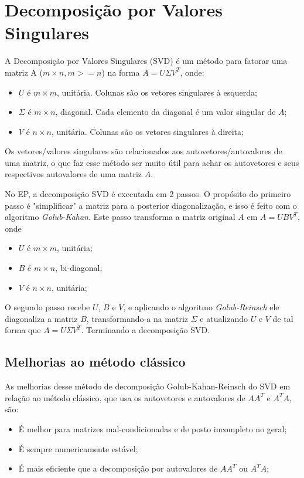 




\cabecalho

\section{Decomposição por Valores Singulares}
A Decomposição por Valores Singulares (SVD) é um método para fatorar uma matriz A ($m\times n, m >= n$) na
forma $A = U \varSigma V^{T}$, onde:
\begin{itemize}
   \item $U$ é $m\times m$, unitária. Colunas são os vetores singulares à esquerda;
   \item $\varSigma$ é $m\times n$, diagonal. Cada elemento da diagonal é um valor singular de $A$;
   \item $V$ é $n\times n$, unitária. Colunas são os vetores singulares à direita;
\end{itemize}
Os vetores/valores singulares são relacionados aos autovetores/autovalores de uma matriz, o que faz esse método
ser muito útil para achar os autovetores e seus respectivos autovalores de uma matriz $A$.

No EP, a decomposição SVD é executada em 2 passos. O propósito do primeiro passo é "simplificar" a matriz para
a posterior diagonalização, e isso é feito com o algoritmo \textit{Golub-Kahan}. Este passo transforma a matriz
original $A$ em $A = UBV^{T}$, onde
\begin{itemize}
   \item $U$ é $m\times m$, unitária;
   \item $B$ é $m\times n$, bi-diagonal;
   \item $V$ é $n\times n$, unitária;
\end{itemize}
O segundo passo recebe $U$, $B$ e $V$, e aplicando o algoritmo \textit{Golub-Reinsch} ele diagonaliza a matriz
$B$, transformando-a na matriz $\varSigma$ e atualizando $U$ e $V$ de tal forma que $A = U \varSigma V^{T}$. 
Terminando a decomposição SVD.


\subsection{Melhorias ao método clássico}
As melhorias desse método de decomposição Golub-Kahan-Reinsch do SVD em relação ao método clássico, que usa os autovetores
e autovalores de $AA^{T}$ e $A^{T}A$, são:
\begin{itemize}
  \item É melhor para matrizes mal-condicionadas e de posto incompleto no geral;
  \item É sempre numericamente estável;
  \item É mais eficiente que a decomposição por autovalores de $AA^{T}$ ou $A^{T}A$;
\end{itemize}

